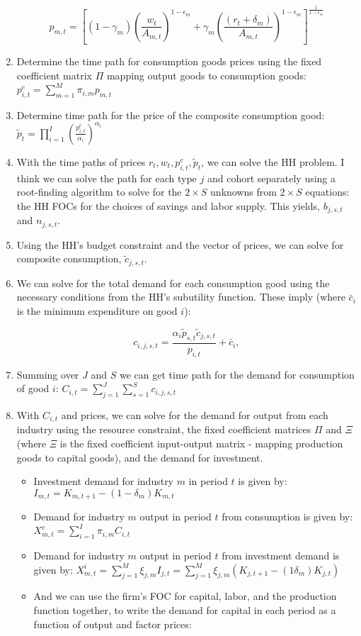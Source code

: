 \documentclass[letterpaper,12pt]{article}
\theoremstyle{definition}
\begin{document}
\begin{spacing}{1.5}
\begin{enumerate}
\begin{equation}
p_{m,t}  = \left[(1-\gamma_{m})\left(\frac{w_{t}}{A_{m,t}}\right)^{1-\epsilon_{m}} + \gamma_{m}\left(\frac{(r_{t}+\delta_{m})}{A_{m,t}}\right)^{1-\epsilon_{m}} \right]^{\frac{1}{1-\epsilon_{m}}}
\end{equation}
\item Determine the time path for consumption goods prices using the fixed coefficient matrix $\Pi$ mapping output goods to consumption goods: $p^{c}_{i,t} = \sum_{m=1}^{M}\pi_{i,m}p_{m,t}$
\item Determine time path for the price of the composite consumption good: $\tilde{p}_{t} =  \prod_{i=1}^{I}\left( \frac{p^{c}_{i,t}}{\alpha_{i}} \right)^{\alpha_{i}}$
\item With the time paths of prices $r_{t}, w_{t}, p^{c}_{i,t}, \tilde{p}_{t}$, we can solve the HH problem.  I think we can solve the path for each type $j$ and cohort separately using a root-finding algorithm to solve for the $2\times S$ unknowns from $2\times S$ equations: the HH FOCs for the choices of savings and labor supply.  This yields, $b_{j,s,t}$ and $n_{j,s,t}$.
\item Using the HH's budget constraint and the vector of prices, we can solve for composite consumption, $\tilde{c}_{j,s,t}$.
\item We can solve for the total demand for each consumption good using the necessary conditions from the HH's subutility function.  These imply (where $\bar{c}_{i}$ is the minimum expenditure on good $i$): 

\begin{equation}
c_{i,j,s,t}  = \frac{\alpha_{i} \tilde{p}_{s,t}\tilde{c}_{j,s,t}}{p_{i,t}} + \bar{c}_{i},
\end{equation}

\item Summing over $J$ and $S$ we can get time path for the demand for consumption of good $i$: $C_{i,t} = \sum_{j=1}^{J}\sum_{s=1}^{S} c_{i,j,s,t}$
\item With $C_{i,t}$ and prices, we can solve for the demand for output from each industry using the resource constraint, the fixed coefficient matrices $\Pi$ and $\Xi$ (where $\Xi$ is the fixed coefficient input-output matrix - mapping production goods to capital goods), and the demand for investment.
	\begin{itemize}
	\item Investment demand for industry $m$ in period $t$ is given by: $I_{m,t} = K_{m,t+1} - (1 - \delta_{m})K_{m,t}$
	\item Demand for industry $m$ output in period $t$ from consumption is given by: $X^{c}_{m,t} = \sum_{i=1}^{I} \pi_{i,m}C_{i,t}$
	\item Demand for industry $m$ output in period $t$ from investment demand is given by: $X^{i}_{m,t} =  \sum_{j=1}^{M} \xi_{j,m}I_{j,t} = \sum_{j=1}^{M} \xi_{j,m}\left(K_{j,t+1} - (1\delta_{m})K_{j,t}\right) $
	\item And we can use the firm's FOC for capital, labor, and the production function together,  to write the demand for capital in each period as a function of output and factor prices: 
	

\end{itemize}
\end{enumerate}
\end{spacing}
\end{document}

